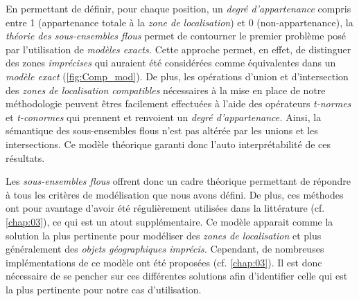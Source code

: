 En permettant de définir, pour chaque position, un \emph{degré
  d'appartenance} compris entre 1 (appartenance totale à la \emph{zone
  de localisation}) et 0 (non-appartenance), la \emph{théorie des
  sous-ensembles flous} permet de contourner le premier problème posé
par l'utilisation de \emph{modèles exacts.} Cette approche permet, en
effet, de distinguer des zones \emph{imprécises} qui auraient été
considérées comme équivalentes dans un \emph{modèle exact}
(\autoref{fig:Comp_mod}). De plus, les opérations d'union et
d'intersection des \emph{zones de localisation compatibles}
nécessaires à la mise en place de notre méthodologie peuvent êtres
facilement effectuées à l'aide des opérateurs \emph{t-normes} et
\emph{t-conormes} qui prennent et renvoient un \emph{degré
  d'appartenance.} Ainsi, la sémantique des sous-ensembles flous n'est
pas altérée par les unions et les intersections. Ce modèle théorique
garanti donc l'auto interprétabilité de ces résultats.

Les \emph{sous-ensembles flous} offrent donc un cadre théorique
permettant de répondre à tous les critères de modélisation que nous
avons défini. De plus, ces méthodes ont pour avantage d'avoir été
régulièrement utilisées dans la littérature (cf. \autoref{chap:03}),
ce qui est un atout supplémentaire. Ce modèle apparait comme la
solution la plus pertinente pour modéliser des \emph{zones de
  localisation} et plus généralement des \emph{objets géographiques
  imprécis.} Cependant, de nombreuses implémentations de ce modèle ont
été proposées (cf. \autoref{chap:03}). Il est donc nécessaire de se
pencher sur ces différentes solutions afin d'identifier celle qui est
la plus pertinente pour notre cas d'utilisation.


